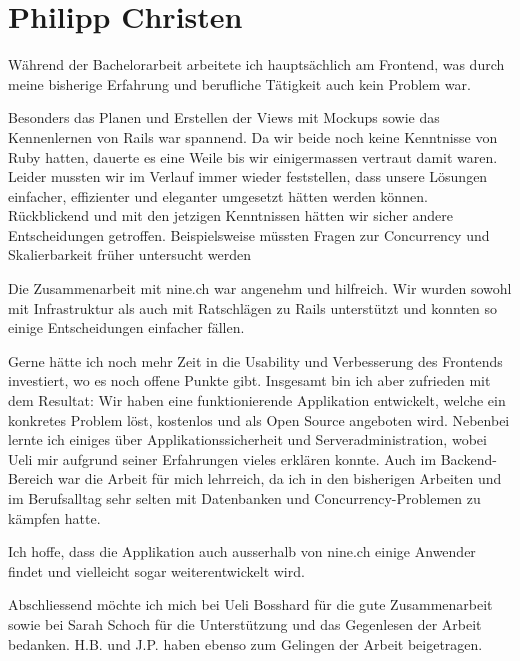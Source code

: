 \section*{Philipp Christen}

Während der Bachelorarbeit arbeitete ich hauptsächlich am Frontend, was durch meine bisherige Erfahrung und berufliche Tätigkeit auch kein Problem war.

Besonders das Planen und Erstellen der Views mit Mockups sowie das Kennenlernen von Rails war spannend. Da wir beide noch keine Kenntnisse von Ruby hatten, dauerte es eine Weile bis wir einigermassen vertraut damit waren. Leider mussten wir im Verlauf immer wieder feststellen, dass unsere Lösungen einfacher, effizienter und eleganter umgesetzt hätten werden können. Rückblickend und mit den jetzigen Kenntnissen hätten wir sicher andere Entscheidungen getroffen. Beispielsweise müssten Fragen zur Concurrency und Skalierbarkeit früher untersucht werden

Die Zusammenarbeit mit nine.ch war angenehm und hilfreich. Wir wurden sowohl mit Infrastruktur als auch mit Ratschlägen zu Rails unterstützt und konnten so einige Entscheidungen einfacher fällen.

Gerne hätte ich noch mehr Zeit in die Usability und Verbesserung des Frontends investiert, wo es noch offene Punkte gibt. Insgesamt bin ich aber zufrieden mit dem Resultat: Wir haben eine funktionierende Applikation entwickelt, welche ein konkretes Problem löst, kostenlos und als Open Source angeboten wird. Nebenbei lernte ich einiges über Applikationssicherheit und Serveradministration, wobei Ueli mir aufgrund seiner Erfahrungen vieles erklären konnte. Auch im Backend-Bereich war die Arbeit für mich lehrreich, da ich in den bisherigen Arbeiten und im Berufsalltag sehr selten mit Datenbanken und Concurrency-Problemen zu kämpfen hatte.

Ich hoffe, dass die Applikation auch ausserhalb von nine.ch einige Anwender findet und vielleicht sogar weiterentwickelt wird.

Abschliessend möchte ich mich bei Ueli Bosshard für die gute Zusammenarbeit sowie bei Sarah Schoch für die Unterstützung und das Gegenlesen der Arbeit bedanken. H.B. und J.P. haben ebenso zum Gelingen der Arbeit beigetragen.
